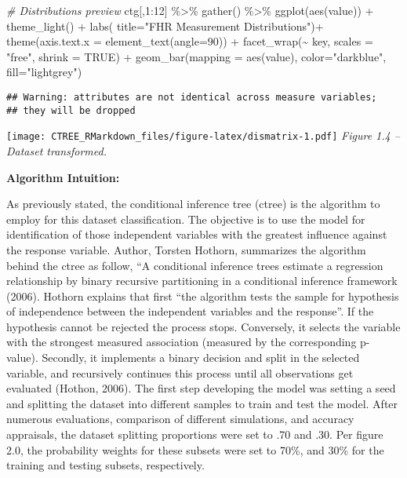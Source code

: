 \documentclass[
]{article}
\newenvironment{Shaded}{\begin{snugshade}}{\end{snugshade}}
\newcommand{\AttributeTok}[1]{\textcolor[rgb]{0.77,0.63,0.00}{#1}}
\newcommand{\CommentTok}[1]{\textcolor[rgb]{0.56,0.35,0.01}{\textit{#1}}}
\newcommand{\ConstantTok}[1]{\textcolor[rgb]{0.00,0.00,0.00}{#1}}
\newcommand{\DecValTok}[1]{\textcolor[rgb]{0.00,0.00,0.81}{#1}}
\newcommand{\FunctionTok}[1]{\textcolor[rgb]{0.00,0.00,0.00}{#1}}
\newcommand{\NormalTok}[1]{#1}
\newcommand{\SpecialCharTok}[1]{\textcolor[rgb]{0.00,0.00,0.00}{#1}}
\newcommand{\StringTok}[1]{\textcolor[rgb]{0.31,0.60,0.02}{#1}}
\begin{document}
\begin{Shaded}
\begin{Highlighting}[]
\CommentTok{\# Distributions preview}
\NormalTok{ctg[,}\DecValTok{1}\SpecialCharTok{:}\DecValTok{12}\NormalTok{] }\SpecialCharTok{\%\textgreater{}\%} 
  \FunctionTok{gather}\NormalTok{() }\SpecialCharTok{\%\textgreater{}\%}                             
  \FunctionTok{ggplot}\NormalTok{(}\FunctionTok{aes}\NormalTok{(value)) }\SpecialCharTok{+}
  \FunctionTok{theme\_light}\NormalTok{() }\SpecialCharTok{+} \FunctionTok{labs}\NormalTok{( }\AttributeTok{title=}\StringTok{"FHR Measurement Distributions"}\NormalTok{)}\SpecialCharTok{+}
  \FunctionTok{theme}\NormalTok{(}\AttributeTok{axis.text.x =} \FunctionTok{element\_text}\NormalTok{(}\AttributeTok{angle=}\DecValTok{90}\NormalTok{)) }\SpecialCharTok{+}                 
  \FunctionTok{facet\_wrap}\NormalTok{(}\SpecialCharTok{\textasciitilde{}}\NormalTok{ key, }\AttributeTok{scales =} \StringTok{"free"}\NormalTok{, }\AttributeTok{shrink =} \ConstantTok{TRUE}\NormalTok{) }\SpecialCharTok{+}  
  \FunctionTok{geom\_bar}\NormalTok{(}\AttributeTok{mapping =} \FunctionTok{aes}\NormalTok{(value), }
           \AttributeTok{color=}\StringTok{"darkblue"}\NormalTok{, }\AttributeTok{fill=}\StringTok{"lightgrey"}\NormalTok{)}
\end{Highlighting}
\end{Shaded}

\begin{verbatim}
## Warning: attributes are not identical across measure variables;
## they will be dropped
\end{verbatim}

\texttt{[image: CTREE\_RMarkdown\_files/figure-latex/dismatrix-1.pdf]}
\emph{Figure 1.4 -- Dataset transformed.}

\textbf{Algorithm Intuition:}

As previously stated, the conditional inference tree (ctree) is the
algorithm to employ for this dataset classification. The objective is to
use the model for identification of those independent variables with the
greatest influence against the response variable. Author, Torsten
Hothorn, summarizes the algorithm behind the ctree as follow, ``A
conditional inference trees estimate a regression relationship by binary
recursive partitioning in a conditional inference framework (2006).
Hothorn explains that first ``the algorithm tests the sample for
hypothesis of independence between the independent variables and the
response''. If the hypothesis cannot be rejected the process stops.
Conversely, it selects the variable with the strongest measured
association (measured by the corresponding p-value). Secondly, it
implements a binary decision and split in the selected variable, and
recursively continues this process until all observations get evaluated
(Hothon, 2006). The first step developing the model was setting a seed
and splitting the dataset into different samples to train and test the
model. After numerous evaluations, comparison of different simulations,
and accuracy appraisals, the dataset splitting proportions were set to
.70 and .30. Per figure 2.0, the probability weights for these subsets
were set to 70\%, and 30\% for the training and testing subsets,
respectively.
\end{document}
